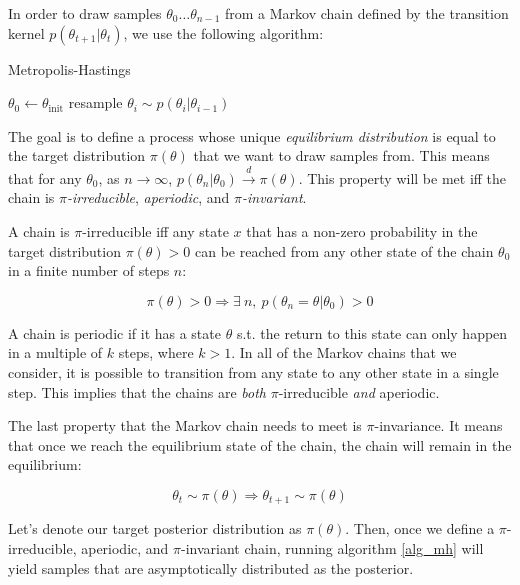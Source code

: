 \documentclass[12pt]{article}
\begin{document}
{In order to draw samples $\theta_0 \ldots \theta_{n-1}$ from a Markov chain defined by the transition kernel $p(\theta_{t+1}|\theta_t)$, we use the following algorithm:

\begin{algorithm}
\caption{Metropolis-Hastings}
\label{alg_mh}
\begin{algorithmic}
\State $\theta_0 \gets \theta_{\textrm{init}}$
	\State resample $\theta_i \sim p(\theta_i|\theta_{i-1})$
\EndFor
\end{algorithmic}
\end{algorithm}

The goal is to define a process whose unique \textit{equilibrium distribution} is equal to the target distribution $\pi(\theta)$ that we want to draw samples from. This means that for any $\theta_0$, as $n \rightarrow \infty$, $p(\theta_n|\theta_0) \xrightarrow{d} \pi(\theta)$. This property will be met iff the chain is \textit{$\pi$-irreducible}, \textit{aperiodic}, and \textit{$\pi$-invariant}.

A chain is $\pi$-irreducible iff any state $x$ that has a non-zero probability in the target distribution $\pi(\theta) > 0$ can be reached from any other state of the chain $\theta_0$ in a finite number of steps $n$:

\begin{equation}
\pi(\theta) > 0 \Rightarrow \exists \ n, \ p(\theta_n = \theta|\theta_0) > 0
\end{equation}

A chain is periodic if it has a state $\theta$ s.t. the return to this state can only happen in a multiple of $k$ steps, where $k > 1$. In all of the Markov chains that we consider, it is possible to transition from any state to any other state in a single step. This implies that the chains are \textit{both} $\pi$-irreducible \textit{and} aperiodic.

The last property that the Markov chain needs to meet is $\pi$-invariance. It means that once we reach the equilibrium state of the chain, the chain will remain in the equilibrium:

\begin{equation}
\theta_t \sim \pi(\theta) \Rightarrow \theta_{t+1} \sim \pi(\theta)
\end{equation}

Let's denote our target posterior distribution as $\pi(\theta)$. Then, once we define a $\pi$-irreducible, aperiodic, and $\pi$-invariant chain, running algorithm \ref{alg_mh} will yield samples that are asymptotically distributed as the posterior.

}
\end{document}
